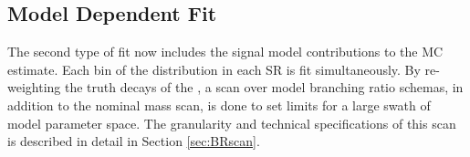 \subsection{Model Dependent Fit}
\label{sec:stats:moddep}
The second type of fit now includes the signal model contributions to the MC estimate. 
Each bin of the \mZl distribution in each SR is fit simultaneously.
By re-weighting the truth decays of the \chono, a scan over model branching ratio schemas, in addition to the nominal mass scan, is done to set limits for a large swath of model parameter space.
The granularity and technical specifications of this scan is described in detail in Section \ref{sec:BRscan}.







